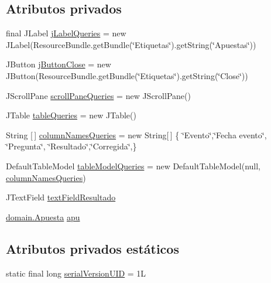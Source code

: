 \subsection*{Atributos privados}
\begin{DoxyCompactItemize}
\item 
final J\+Label \mbox{\hyperlink{classgui_1_1MeterResultadosGUI_a7b346c03a4e3e6e9b6a4b280a73da693}{j\+Label\+Queries}} = new J\+Label(Resource\+Bundle.\+get\+Bundle(\char`\"{}Etiquetas\char`\"{}).get\+String(\char`\"{}Apuestas\char`\"{}))
\item 
J\+Button \mbox{\hyperlink{classgui_1_1MeterResultadosGUI_a18640ba21118837b12dd167366965f57}{j\+Button\+Close}} = new J\+Button(Resource\+Bundle.\+get\+Bundle(\char`\"{}Etiquetas\char`\"{}).get\+String(\char`\"{}Close\char`\"{}))
\item 
J\+Scroll\+Pane \mbox{\hyperlink{classgui_1_1MeterResultadosGUI_a1dbee32fc39f903b2a5cdbb09301368f}{scroll\+Pane\+Queries}} = new J\+Scroll\+Pane()
\item 
J\+Table \mbox{\hyperlink{classgui_1_1MeterResultadosGUI_a21b8ddf3a50cf3fb49737078ff9fe7ba}{table\+Queries}} = new J\+Table()
\item 
String \mbox{[}$\,$\mbox{]} \mbox{\hyperlink{classgui_1_1MeterResultadosGUI_a627fb2fd35893e8742ee7db4723cfd97}{column\+Names\+Queries}} = new String\mbox{[}$\,$\mbox{]} \{ \char`\"{}Evento\char`\"{},\char`\"{}Fecha evento\char`\"{}, \char`\"{}Pregunta\char`\"{}, \char`\"{}Resultado\char`\"{},\char`\"{}Corregida\char`\"{},\}
\item 
Default\+Table\+Model \mbox{\hyperlink{classgui_1_1MeterResultadosGUI_a80d5962a095c4cb15ea9adde965fc730}{table\+Model\+Queries}} = new Default\+Table\+Model(null, \mbox{\hyperlink{classgui_1_1MeterResultadosGUI_a627fb2fd35893e8742ee7db4723cfd97}{column\+Names\+Queries}})
\item 
J\+Text\+Field \mbox{\hyperlink{classgui_1_1MeterResultadosGUI_a3ac9b2987e549c1ba2fd7b26b257ff57}{text\+Field\+Resultado}}
\item 
\mbox{\hyperlink{classdomain_1_1Apuesta}{domain.\+Apuesta}} \mbox{\hyperlink{classgui_1_1MeterResultadosGUI_acf472c1e18849ac7970bd55052a927b6}{apu}}
\end{DoxyCompactItemize}
\subsection*{Atributos privados estáticos}
\begin{DoxyCompactItemize}
\item 
static final long \mbox{\hyperlink{classgui_1_1MeterResultadosGUI_a14d6fdea71a82da0b570b99c866e7464}{serial\+Version\+U\+ID}} = 1L
\end{DoxyCompactItemize}


